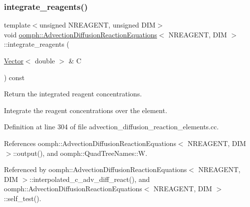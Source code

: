 \subsubsection{\texorpdfstring{integrate\+\_\+reagents()}{integrate\_reagents()}}
{\footnotesize\ttfamily template$<$unsigned N\+R\+E\+A\+G\+E\+NT, unsigned D\+IM$>$ \\
void \hyperlink{classoomph_1_1AdvectionDiffusionReactionEquations}{oomph\+::\+Advection\+Diffusion\+Reaction\+Equations}$<$ N\+R\+E\+A\+G\+E\+NT, D\+IM $>$\+::integrate\+\_\+reagents (\begin{DoxyParamCaption}\item[{\hyperlink{classoomph_1_1Vector}{Vector}$<$ double $>$ \&}]{C }\end{DoxyParamCaption}) const}



Return the integrated reagent concentrations. 

Integrate the reagent concentrations over the element. 

Definition at line 304 of file advection\+\_\+diffusion\+\_\+reaction\+\_\+elements.\+cc.



References oomph\+::\+Advection\+Diffusion\+Reaction\+Equations$<$ N\+R\+E\+A\+G\+E\+N\+T, D\+I\+M $>$\+::output(), and oomph\+::\+Quad\+Tree\+Names\+::W.



Referenced by oomph\+::\+Advection\+Diffusion\+Reaction\+Equations$<$ N\+R\+E\+A\+G\+E\+N\+T, D\+I\+M $>$\+::interpolated\+\_\+c\+\_\+adv\+\_\+diff\+\_\+react(), and oomph\+::\+Advection\+Diffusion\+Reaction\+Equations$<$ N\+R\+E\+A\+G\+E\+N\+T, D\+I\+M $>$\+::self\+\_\+test().

\mbox{\label{classoomph_1_1AdvectionDiffusionReactionEquations_a9346b9c6e14ebc68149dc2a571416112}} 
